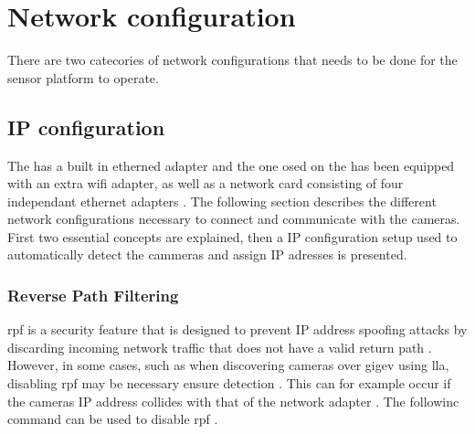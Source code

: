\section{Network configuration}
There are two catecories of network configurations that needs to be done for the sensor platform to operate.



\subsection{IP configuration}
The \jx has a built in etherned adapter and the one osed on the \sr has been equipped with an extra wifi adapter, as well as a network card consisting of four independant ethernet adapters \cite{martensPortableSensorRig2022}.
The following section describes the different network configurations necessary to connect and communicate with the cameras. First two essential concepts are explained, then a IP configuration setup used to automatically detect the cammeras and assign IP adresses is presented.


\subsubsection{Reverse Path Filtering}
\gls{rpf} is a security feature that is designed to prevent IP address spoofing attacks by discarding incoming network traffic that does not have a valid return path \cite{ReversePathFiltering}.
However, in some cases, such as when discovering cameras over \gls{gigev} using \gls{lla}, disabling \gls{rpf} may be necessary ensure detection \cite{lucidvisionlabsArenaSoftwareDevelopment2020}. This can for example occur if the cameras IP address collides with that of the network adapter \cite{lucidvisionlabsArenaSoftwareDevelopment2020}. The followinc command can be used to disable \gls{rpf} .

